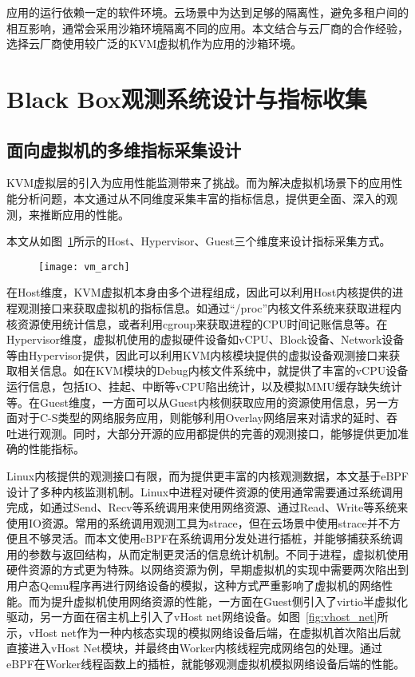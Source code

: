应用的运行依赖一定的软件环境。云场景中为达到足够的隔离性，避免多租户间的相互影响，通常会采用沙箱环境隔离不同的应用。本文结合与云厂商的合作经验，选择云厂商使用较广泛的KVM虚拟机作为应用的沙箱环境。

\section{Black Box观测系统设计与指标收集}

\subsection{面向虚拟机的多维指标采集设计}


KVM虚拟层的引入为应用性能监测带来了挑战。而为解决虚拟机场景下的应用性能分析问题，本文通过从不同维度采集丰富的指标信息，提供更全面、深入的观测，来推断应用的性能。

本文从如图~\ref{fig:vm_arch}所示的Host、Hypervisor、Guest三个维度来设计指标采集方式。

\begin{figure}[!htbp]
    \centering
    \texttt{[image: vm\_arch]}
    \label{fig:vm_arch}
\end{figure}

在Host维度，KVM虚拟机本身由多个进程组成，因此可以利用Host内核提供的进程观测接口来获取虚拟机的指标信息。如通过“/proc”内核文件系统来获取进程内核资源使用统计信息，或者利用cgroup来获取进程的CPU时间记账信息等。在Hypervisor维度，虚拟机使用的虚拟硬件设备如vCPU、Block设备、Network设备等由Hypervisor提供，因此可以利用KVM内核模块提供的虚拟设备观测接口来获取相关信息。如在KVM模块的Debug内核文件系统中，就提供了丰富的vCPU设备运行信息，包括IO、挂起、中断等vCPU陷出统计，以及模拟MMU缓存缺失统计等。在Guest维度，一方面可以从Guest内核侧获取应用的资源使用信息，另一方面对于C-S类型的网络服务应用，则能够利用Overlay网络层来对请求的延时、吞吐进行观测。同时，大部分开源的应用都提供的完善的观测接口，能够提供更加准确的性能指标。

Linux内核提供的观测接口有限，而为提供更丰富的内核观测数据，本文基于eBPF设计了多种内核监测机制。Linux中进程对硬件资源的使用通常需要通过系统调用完成，如通过Send、Recv等系统调用来使用网络资源、通过Read、Write等系统来使用IO资源。常用的系统调用观测工具为strace，但在云场景中使用strace并不方便且不够灵活。而本文使用eBPF在系统调用分发处进行插桩，并能够捕获系统调用的参数与返回结构，从而定制更灵活的信息统计机制。不同于进程，虚拟机使用硬件资源的方式更为特殊。以网络资源为例，早期虚拟机的实现中需要两次陷出到用户态Qemu程序再进行网络设备的模拟，这种方式严重影响了虚拟机的网络性能。而为提升虚拟机使用网络资源的性能，一方面在Guest侧引入了virtio半虚拟化驱动，另一方面在宿主机上引入了vHost net网络设备。如图~\ref{fig:vhost_net}所示，vHost net作为一种内核态实现的模拟网络设备后端，在虚拟机首次陷出后就直接进入vHost Net模块，并最终由Worker内核线程完成网络包的处理。通过eBPF在Worker线程函数上的插桩，就能够观测虚拟机模拟网络设备后端的性能。

